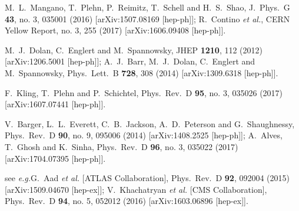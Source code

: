 \documentclass[aps,prd,11pt,tightenlines,superscriptaddress,nofootinbib,preprintnumbers,notitlepage]{revtex4-1}
\newcommand{\eg}{\textsl{e.g.}\;}
\begin{document}
\begin{thebibliography}{99}
  M.~L.~Mangano, T.~Plehn, P.~Reimitz, T.~Schell and H.~S.~Shao,
  J.\ Phys.\ G {\bf 43}, no. 3, 035001 (2016)
  [arXiv:1507.08169 [hep-ph]];
  R.~Contino {\it et al.},
  CERN Yellow Report, no. 3, 255 (2017)
  [arXiv:1606.09408 [hep-ph]].

  M.~J.~Dolan, C.~Englert and M.~Spannowsky,
  JHEP {\bf 1210}, 112 (2012)
  [arXiv:1206.5001 [hep-ph]];
  A.~J.~Barr, M.~J.~Dolan, C.~Englert and M.~Spannowsky,
  Phys.\ Lett.\ B {\bf 728}, 308 (2014)
  [arXiv:1309.6318 [hep-ph]].

  F.~Kling, T.~Plehn and P.~Schichtel,
  Phys.\ Rev.\ D {\bf 95}, no. 3, 035026 (2017)
  [arXiv:1607.07441 [hep-ph]].

  V.~Barger, L.~L.~Everett, C.~B.~Jackson, A.~D.~Peterson and G.~Shaughnessy,
  Phys.\ Rev.\ D {\bf 90}, no. 9, 095006 (2014)
  [arXiv:1408.2525 [hep-ph]];
  A.~Alves, T.~Ghosh and K.~Sinha,
  Phys.\ Rev.\ D {\bf 96}, no. 3, 035022 (2017)
  [arXiv:1704.07395 [hep-ph]].

  see \eg G.~Aad {\it et al.} [ATLAS Collaboration],
  Phys.\ Rev.\ D {\bf 92}, 092004 (2015)
  [arXiv:1509.04670 [hep-ex]];
  V.~Khachatryan {\it et al.} [CMS Collaboration],
  Phys.\ Rev.\ D {\bf 94}, no. 5, 052012 (2016)
  [arXiv:1603.06896 [hep-ex]].


\end{thebibliography}
\end{document}
